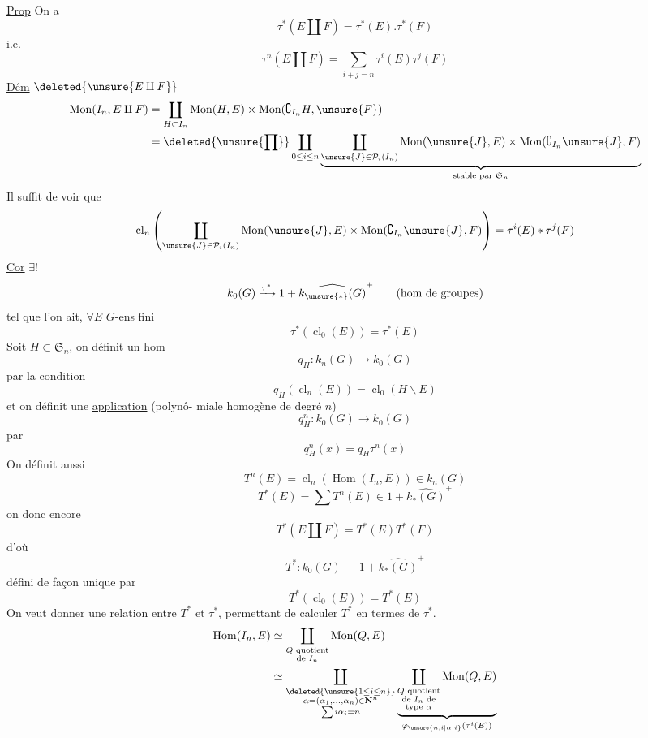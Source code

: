 \uline{Prop} On a
\[
\tau^*(E\amalg F)=\tau^*(E).\tau^*(F)
\]
i.e.
\[
\tau^n(E\amalg F)=\sum_{i+j=n}\tau^i(E)\tau^j(F)
\]
\uline{Dém} $\deleted{\unsure{E\amalg F}}$
\[
\begin{aligned}
\operatorname{Mon}(I_n,E\amalg F)&=\coprod_{H\subset I_n}\operatorname{Mon}(H,E)\times\operatorname{Mon}(\complement_{I_n}H,\unsure{F})\\
&=\deleted{\unsure{\prod}}\coprod_{0\leq i\leq n}\underbrace{\coprod_{\unsure{J}\in\mathcal P_i(I_n)}\operatorname{Mon}(\unsure{J},E)\times\operatorname{Mon}(\complement_{I_n}\unsure{J},F)}_{\text{stable par }\mathfrak S_n}
\end{aligned}
\]
Il suffit de voir que
\[
\operatorname{cl}_n\left(\coprod_{\unsure{J}\in\mathcal P_i(I_n)}\operatorname{Mon}(\unsure{J},E)\times\operatorname{Mon}(\complement_{I_n}\unsure{J},F)\right)=\tau^i(E)*\tau^j(F)
\]
\uline{Cor} $\exists!$
\[
k_0(G)\xrightarrow{\tau^*}1+\widehat{k_{\unsure{*}}(G)}^+\qquad(\text{hom de groupes})
\]
tel que l'on ait, $\forall E$ $G$-ens fini
\[
\tau^*(\operatorname{cl}_0(E))=\tau^*(E)
\]
Soit $H\subset\mathfrak S_n$,  on définit un hom
\[
q_H:k_n(G)\longrightarrow k_0(G)
\]
par la condition
\[
q_H(\operatorname{cl}_n(E))=\operatorname{cl}_0(H\backslash E)
\]
et on définit une  \uline{application} (polynô-
miale homogène de degré $n$)
\[
q_H^n:k_0(G)\longrightarrow k_0(G)
\]
par
\[
q_H^n(x)=q_H\tau^n(x)
\]
On définit aussi
\[
T^n(E)=\operatorname{cl}_n(\operatorname{Hom}(I_n,E))\in k_n(G)
\]
\[
T^*(E)=\sum T^n(E)\in1+\widehat{k_*(G)}^+
\]
on donc encore
\[
T^*(E\amalg F)=T^*(E)T^*(F)
\]
d'où
\[
T^*:k_0(G)\mathbin{\text{---}}1+\widehat{k_*(G)}^+
\]
défini de façon unique par
\[
T^*(\operatorname{cl}_0(E))=T^*(E)
\]
On veut donner une relation entre $T^*$ et $\tau^*$,
permettant de calculer $T^*$ en termes de $\tau^*$.
\[
\begin{aligned}
\operatorname{Hom}(I_n,E)&\simeq\coprod_{\substack{Q\text{ quotient}\\\text{de }I_n}}\operatorname{Mon}(Q,E)\\
&\simeq\coprod_{\substack{\deleted{\unsure{1\leq i\leq n}}\\\alpha=(\alpha_1,\ldots,\alpha_n)\in\mathbf N^n\\\sum i\alpha_i=n}}\underbrace{\coprod_{\substack{Q\text{ quotient}\\\text{de }I_n\text{ de}\\\text{type }\alpha}}\operatorname{Mon}(Q,E)}_{\varphi_{\unsure{n,i|\alpha,i}}(\tau^i(E))}
\end{aligned}
\]
